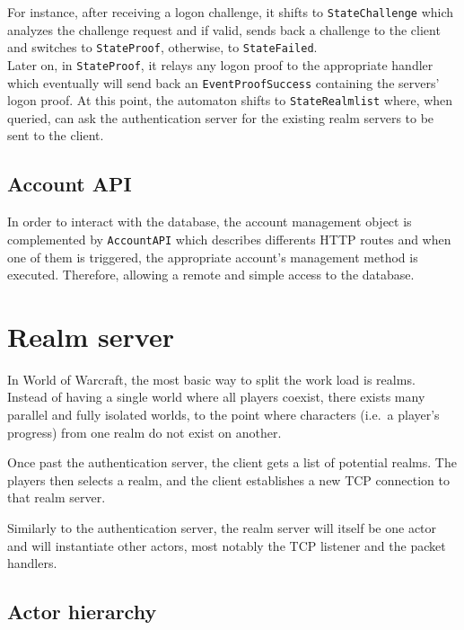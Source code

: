 \documentclass[paper=a4, fontsize=11pt]{scrartcl}
\begin{document}
For instance, after receiving a logon challenge, it shifts
to \texttt{StateChallenge} which analyzes the challenge request and if valid, 
sends back a challenge to the client and switches to \texttt{StateProof}, 
otherwise, to \texttt{StateFailed}. \\

Later on, in \texttt{StateProof}, it relays any logon proof to the appropriate handler
which eventually will send back an \texttt{EventProofSuccess} containing the servers' logon
proof. At this point, the automaton shifts to \texttt{StateRealmlist} where, when queried, 
can ask the authentication server for the existing realm servers to be sent to
the client. \\

\subsection{Account API}
In order to interact with the database, the account management object is 
complemented by \texttt{AccountAPI} which describes differents HTTP routes 
and when one of them is triggered, the appropriate account's management method is
executed. Therefore, allowing a remote and simple access to the database.


\section{Realm server}

In World of Warcraft, the most basic way to split the work load is
realms.
Instead of having a single world where all players coexist, there exists many
parallel and fully isolated worlds, to the point where characters (i.e.\ a
player's progress) from one realm do not exist on another.

Once past the authentication server, the client gets a list of potential realms.
The players then selects a realm, and the client establishes a new TCP
connection to that realm server.

Similarly to the authentication server, the realm server will itself be one
actor and will instantiate other actors, most notably the TCP listener and the
packet handlers.


\subsection{Actor hierarchy}
\end{document}
